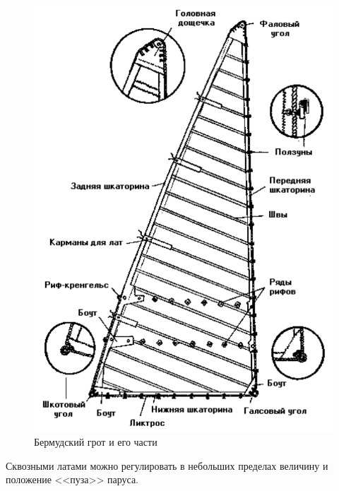 \documentclass[a4paper, 12pt, twoside, final]{scrbook}
\begin{document}
\begin{figure}[htbp]
\begin{centering}
\includegraphics{pics/Bermudskij_grot}
\par\end{centering}

\protect\caption{\label{fig:35}Бермудский грот и его части}
\end{figure}


Сквозными латами можно регулировать в небольших пределах величину
и положение <<пуза>> паруса.
\end{document}
